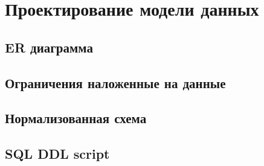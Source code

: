\documentclass[a4paper,16pt]{article}
\begin{document}
\section{Проектирование модели данных}
\subsection{ER диаграмма}
\subsection{Ограничения наложенные на данные}
\subsection{Нормализованная схема}
\subsection{SQL DDL script}
\end{document}
